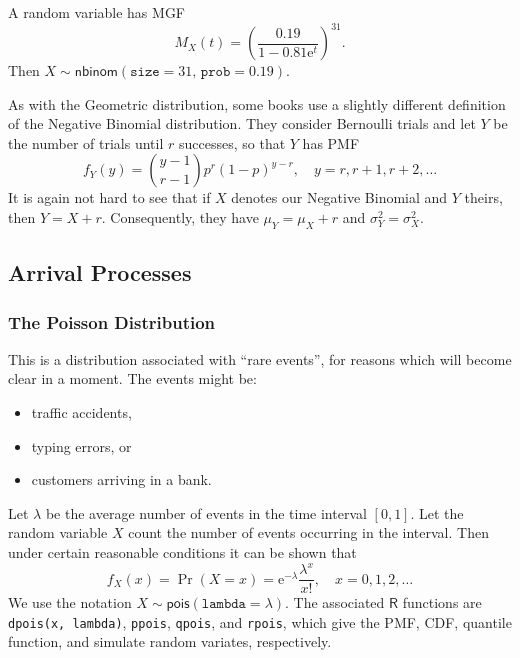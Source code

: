 \documentclass[captions=tableheading]{scrbook}
\begin{document}
\begin{example}
A random variable has MGF
\[
M_{X}(t)=\left(\frac{0.19}{1-0.81\mathrm{e}^{t}}\right)^{31}.
\]
Then \(X\sim\mathsf{nbinom}(\mathtt{size}=31,\,\mathtt{prob}=0.19)\).
\end{example}

\begin{note}
As with the Geometric distribution, some books use a slightly different definition of the Negative Binomial distribution. They consider Bernoulli trials and let \(Y\) be the number of trials until \(r\) successes, so that \(Y\) has PMF
\begin{equation}
f_{Y}(y)={y-1 \choose r-1}p^{r}(1-p)^{y-r},\quad y=r,r+1,r+2,\ldots
\end{equation}
It is again not hard to see that if \(X\) denotes our Negative Binomial and \(Y\) theirs, then \(Y=X+r\). Consequently, they have \(\mu_{Y}=\mu_{X}+r\) and \(\sigma_{Y}^{2}=\sigma_{X}^{2}\).
\end{note}
\subsection{Arrival Processes}
\label{sec-5-6-3}
\label{sec-Arrival-Processes}
\subsubsection{The Poisson Distribution}
\label{sec-5-6-3-1}
\label{sub-The-Poisson-Distribution}


This is a distribution associated with ``rare events'', for reasons which will become clear in a moment. The events might be:
\begin{itemize}
\item traffic accidents,
\item typing errors, or
\item customers arriving in a bank.
\end{itemize}


Let \(\lambda\) be the average number of events in the time interval \([0,1]\). Let the random variable \(X\) count the number of events occurring in the interval. Then under certain reasonable conditions it can be shown that
\begin{equation}
f_{X}(x)=\Pr(X=x)=\mathrm{e}^{-\lambda}\frac{\lambda^{x}}{x!},\quad x=0,1,2,\ldots
\end{equation}
We use the notation \(X\sim\mathsf{pois}(\mathtt{lambda}=\lambda)\). The associated \(\mathsf{R}\) functions are \texttt{dpois(x, lambda)}, \texttt{ppois}, \texttt{qpois}, and \texttt{rpois}, which give the PMF, CDF, quantile function, and simulate random variates, respectively.
\end{document}
